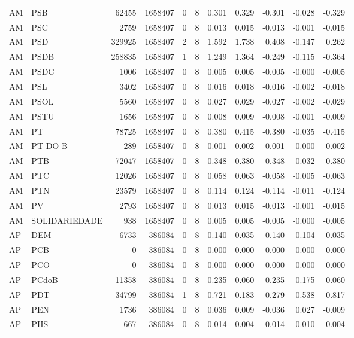 \begin{landscape}
\begin{longtable}{llrrrrrrrrr}
AM & PSB & 62455 & 1658407 & 0 & 8 & 0.301 & 0.329 & -0.301 & -0.028 & -0.329 \\
AM & PSC & 2759 & 1658407 & 0 & 8 & 0.013 & 0.015 & -0.013 & -0.001 & -0.015 \\
AM & PSD & 329925 & 1658407 & 2 & 8 & 1.592 & 1.738 & 0.408 & -0.147 & 0.262 \\
AM & PSDB & 258835 & 1658407 & 1 & 8 & 1.249 & 1.364 & -0.249 & -0.115 & -0.364 \\
AM & PSDC & 1006 & 1658407 & 0 & 8 & 0.005 & 0.005 & -0.005 & -0.000 & -0.005 \\
AM & PSL & 3402 & 1658407 & 0 & 8 & 0.016 & 0.018 & -0.016 & -0.002 & -0.018 \\
AM & PSOL & 5560 & 1658407 & 0 & 8 & 0.027 & 0.029 & -0.027 & -0.002 & -0.029 \\
AM & PSTU & 1656 & 1658407 & 0 & 8 & 0.008 & 0.009 & -0.008 & -0.001 & -0.009 \\
AM & PT & 78725 & 1658407 & 0 & 8 & 0.380 & 0.415 & -0.380 & -0.035 & -0.415 \\
AM & PT DO B & 289 & 1658407 & 0 & 8 & 0.001 & 0.002 & -0.001 & -0.000 & -0.002 \\
AM & PTB & 72047 & 1658407 & 0 & 8 & 0.348 & 0.380 & -0.348 & -0.032 & -0.380 \\
AM & PTC & 12026 & 1658407 & 0 & 8 & 0.058 & 0.063 & -0.058 & -0.005 & -0.063 \\
AM & PTN & 23579 & 1658407 & 0 & 8 & 0.114 & 0.124 & -0.114 & -0.011 & -0.124 \\
AM & PV & 2793 & 1658407 & 0 & 8 & 0.013 & 0.015 & -0.013 & -0.001 & -0.015 \\
AM & SOLIDARIEDADE & 938 & 1658407 & 0 & 8 & 0.005 & 0.005 & -0.005 & -0.000 & -0.005 \\
AP & DEM & 6733 & 386084 & 0 & 8 & 0.140 & 0.035 & -0.140 & 0.104 & -0.035 \\
AP & PCB & 0 & 386084 & 0 & 8 & 0.000 & 0.000 & 0.000 & 0.000 & 0.000 \\
AP & PCO & 0 & 386084 & 0 & 8 & 0.000 & 0.000 & 0.000 & 0.000 & 0.000 \\
AP & PCdoB & 11358 & 386084 & 0 & 8 & 0.235 & 0.060 & -0.235 & 0.175 & -0.060 \\
AP & PDT & 34799 & 386084 & 1 & 8 & 0.721 & 0.183 & 0.279 & 0.538 & 0.817 \\
AP & PEN & 1736 & 386084 & 0 & 8 & 0.036 & 0.009 & -0.036 & 0.027 & -0.009 \\
AP & PHS & 667 & 386084 & 0 & 8 & 0.014 & 0.004 & -0.014 & 0.010 & -0.004 \\

\end{longtable}
\end{landscape}
